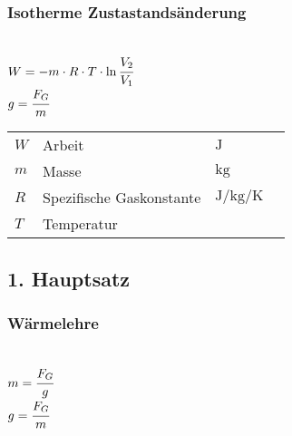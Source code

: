 \documentclass[a4paper, 10pt]{article}
\begin{document}
\subsubsection{Isotherme Zustastandsänderung}
\begin{minipage}{0.45\textwidth}

 \\
$W = -m \cdot R \cdot T \cdot \ln{\cfrac{V_2}{V_1}}$ \\
$g = \cfrac{F_G}{m}$

\end{minipage}
\begin{minipage}{0.45\textwidth}

\begin{tabular}{llll}
$W$ & Arbeit & $\si{\joule}$ & \\
$m$ & Masse & $\si{\kilogram}$ &  \\
$R$ & Spezifische Gaskonstante & $\si{\joule\per\kilogram\per\kelvin} $ & $ $ \\
$T$ & Temperatur & $\si{} $ & \\
\end{tabular}

\end{minipage}

\subsection{1. Hauptsatz}
\subsubsection{Wärmelehre}
\begin{minipage}{0.45\textwidth}

 \\
$m = \cfrac{F_G}{g}$ \\
$g = \cfrac{F_G}{m}$

\end{minipage}
\begin{minipage}{0.45\textwidth}
\noindent{}%
\end{minipage}
\end{document}
